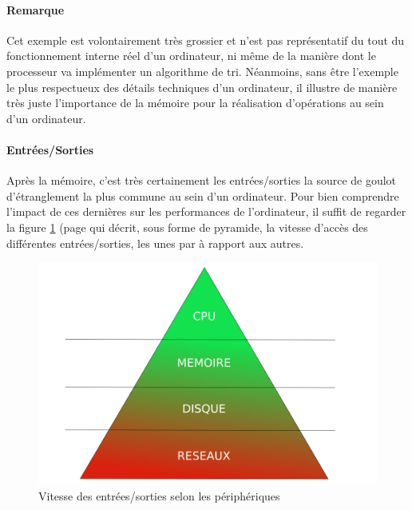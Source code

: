 {  \paragraph{Remarque} Cet exemple est volontairement très grossier et n'est pas représentatif du
  tout du fonctionnement interne réel d'un ordinateur, ni même de la manière dont le processeur va
  implémenter un algorithme de tri. Néanmoins, sans être l'exemple le plus respectueux des détails
  techniques d'un ordinateur, il illustre de manière très juste l'importance de la mémoire pour la
  réalisation d'opérations au sein d'un ordinateur.

  \paragraph{Entrées/Sorties} Après la mémoire, c'est très certainement les entrées/sorties la
  source de goulot d'étranglement la plus commune au sein d'un ordinateur. Pour bien comprendre
  l'impact de ces dernières sur les performances de l'ordinateur, il suffit de regarder la figure
  \ref{pyramid-io} (page \pageref{pyramid-io} qui décrit, sous forme de pyramide, la vitesse d'accès
  des différentes entrées/sorties, les unes par à rapport aux autres.

  \begin{figure}[h]
    \begin{center}
      \includegraphics[scale=0.3]{img/pyramid-io.png}
      \caption{Vitesse des entrées/sorties selon les périphériques}
      \label{pyramid-io}
    \end{center}
  \end{figure}

}

